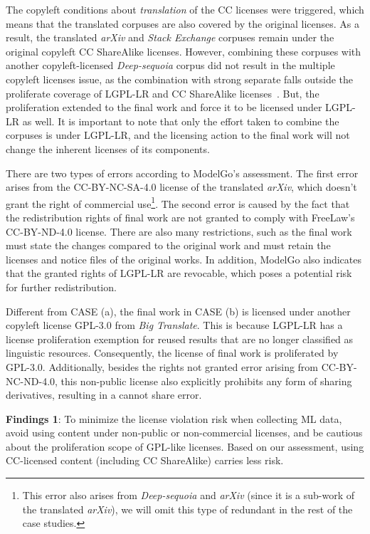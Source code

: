 The copyleft conditions about \textit{translation} of the CC licenses were triggered, which means that the translated corpuses are also covered by the original licenses.
As a result, the translated \textit{arXiv} and \textit{Stack Exchange} corpuses remain under the original copyleft CC ShareAlike licenses. 
However, combining these corpuses with another copyleft-licensed \textit{Deep-sequoia} corpus did not result in the multiple copyleft licenses issue, as the combination with strong separate falls outside the proliferate coverage of LGPL-LR and CC ShareAlike licenses~\cite{creative2023artificial}.
But, the proliferation extended to the final work and force it to be licensed under LGPL-LR as well.
It is important to note that only the effort taken to combine the corpuses is under LGPL-LR, and the licensing action to the final work will not change the inherent licenses of its components.

There are two types of errors according to ModelGo's assessment.
The first error arises from the CC-BY-NC-SA-4.0 license of the translated \textit{arXiv}, which doesn't grant the right of commercial use\footnote{This error also arises from \textit{Deep-sequoia} and \textit{arXiv} (since it is a sub-work of the translated \textit{arXiv}), we will omit this type of redundant in the rest of the case studies.}. 
The second error is caused by the fact that the redistribution rights of final work are not granted to comply with FreeLaw's CC-BY-ND-4.0 license.
There are also many restrictions, such as the final work must state the changes compared to the original work and must retain the licenses and notice files of the original works.
In addition, ModelGo also indicates that the granted rights of LGPL-LR are revocable, which poses a potential risk for further redistribution.

Different from CASE  (a), the final work in CASE  (b) is licensed under another copyleft license GPL-3.0 from \textit{Big Translate}.
This is because LGPL-LR has a license proliferation exemption for reused results that are no longer classified as linguistic resources.
Consequently, the license of final work is proliferated by GPL-3.0.
Additionally, besides the rights not granted error arising from CC-BY-NC-ND-4.0, this non-public license also explicitly prohibits any form of sharing derivatives, resulting in a cannot share error.

\begin{tcolorbox}
\textbf{Findings 1}: To minimize the license violation risk when collecting ML data, avoid using content under non-public or non-commercial licenses, and be cautious about the proliferation scope of GPL-like licenses.
Based on our assessment, using CC-licensed content (including CC ShareAlike) carries less risk.
\end{tcolorbox}

